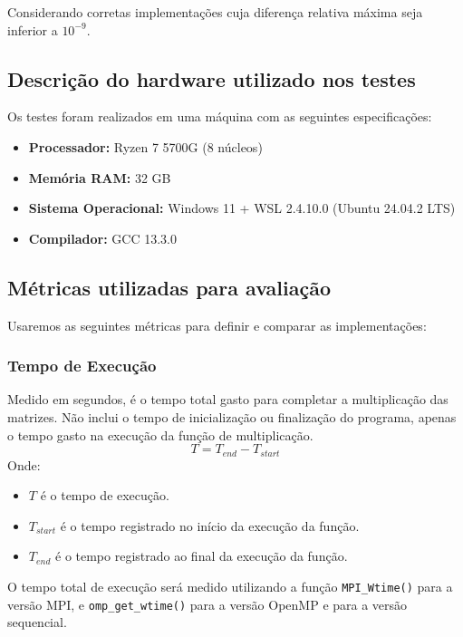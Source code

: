 \documentclass[12pt, a4paper]{article}
\begin{document}
    Considerando corretas implementações cuja diferença relativa máxima seja inferior a $10^{-9}$.

    \subsection{Descrição do hardware utilizado nos testes}

    Os testes foram realizados em uma máquina com as seguintes especificações:
    \begin{itemize}
        \item \textbf{Processador:} Ryzen 7 5700G (8 núcleos)
        \item \textbf{Memória RAM:} 32 GB
        \item \textbf{Sistema Operacional:} Windows 11 + WSL 2.4.10.0 (Ubuntu 24.04.2 LTS)
        \item \textbf{Compilador:} GCC 13.3.0
    \end{itemize}

    \subsection{Métricas utilizadas para avaliação}
	
    Usaremos as seguintes métricas para definir e comparar as implementações:

    \subsubsection{Tempo de Execução}

    Medido em segundos, é o tempo total gasto para completar a multiplicação das matrizes. Não inclui o tempo de inicialização ou finalização do programa, apenas o tempo gasto na execução da função de multiplicação.
    \[
        T = T_{end} - T_{start}
    \]
    Onde:
    \begin{itemize}
        \item $T$ é o tempo de execução.
        \item $T_{start}$ é o tempo registrado no início da execução da função.
        \item $T_{end}$ é o tempo registrado ao final da execução da função.
    \end{itemize}

    O tempo total de execução será medido utilizando a função \texttt{MPI\_Wtime()} para a versão MPI, e \texttt{omp\_get\_wtime()} para a versão OpenMP e para a versão sequencial.
\end{document}

